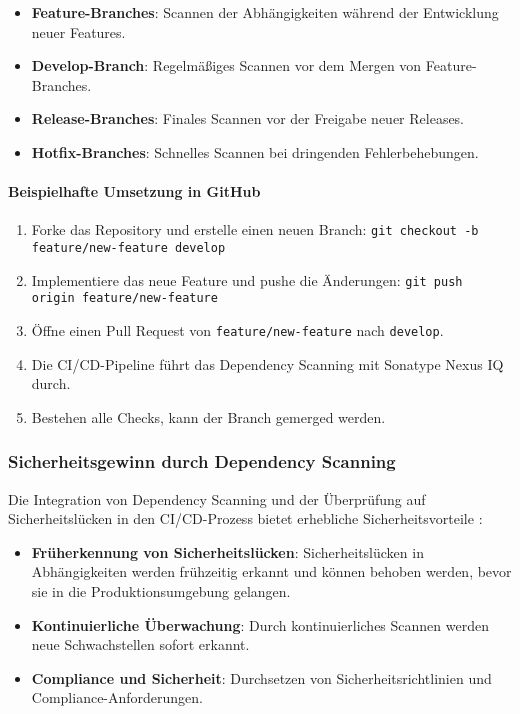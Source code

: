 \begin{itemize}
    \item \textbf{Feature-Branches}: Scannen der Abhängigkeiten während der Entwicklung neuer Features.
    \item \textbf{Develop-Branch}: Regelmäßiges Scannen vor dem Mergen von Feature-Branches.
    \item \textbf{Release-Branches}: Finales Scannen vor der Freigabe neuer Releases.
    \item \textbf{Hotfix-Branches}: Schnelles Scannen bei dringenden Fehlerbehebungen.
\end{itemize}

\paragraph{Beispielhafte Umsetzung in GitHub}

\begin{enumerate}
    \item Forke das Repository und erstelle einen neuen Branch: \texttt{git checkout -b feature/new-feature develop}
    \item Implementiere das neue Feature und pushe die Änderungen: \texttt{git push origin feature/new-feature}
    \item Öffne einen Pull Request von \texttt{feature/new-feature} nach \texttt{develop}.
    \item Die CI/CD-Pipeline führt das Dependency Scanning mit Sonatype Nexus IQ durch.
    \item Bestehen alle Checks, kann der Branch gemerged werden.
\end{enumerate}

\subsubsection{Sicherheitsgewinn durch Dependency Scanning}

Die Integration von Dependency Scanning und der Überprüfung auf Sicherheitslücken in den CI/CD-Prozess bietet erhebliche Sicherheitsvorteile \cite{Vasquez2018}:

\begin{itemize}
    \item \textbf{Früherkennung von Sicherheitslücken}: Sicherheitslücken in Abhängigkeiten werden frühzeitig erkannt und können behoben werden, bevor sie in die Produktionsumgebung gelangen.
    \item \textbf{Kontinuierliche Überwachung}: Durch kontinuierliches Scannen werden neue Schwachstellen sofort erkannt.
    \item \textbf{Compliance und Sicherheit}: Durchsetzen von Sicherheitsrichtlinien und Compliance-Anforderungen.
\end{itemize}

